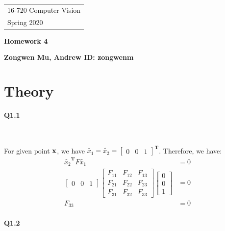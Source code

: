 \documentclass[11pt]{article} \usepackage{fullpage} \usepackage{graphicx} \usepackage{epstopdf} \usepackage{color} \usepackage{psfrag} \usepackage{pdfsync}\usepackage{indentfirst}\usepackage{subfigure}\usepackage{float}\usepackage[section]{placeins}
\begin{document}
{\parindent 0pt \begin{tabular}[t]{l} 16-720 Computer Vision \\ Spring 2020 \end{tabular}}%
\parindent 0pt \parskip 8pt
\begin{center} \large\bf Homework 4 \end{center}
\begin{center} \large\bf Zongwen Mu, Andrew ID: zongwenm \end{center}
\bigskip


\section{Theory}

\setlength{\parindent}{2em}  

\paragraph{Q1.1}~{}

For given point $\bold{x}$, we have $\tilde{x_1} = \tilde{x_2} = \begin{bmatrix} 0 & 0 & 1 \end{bmatrix}^\mathbf{T}$. Therefore, we have:
\begin{align}
	\tilde{x_2}^\mathbf{T}F\tilde{x_1} & = 0 \\
	\begin{bmatrix}
	0 & 0 & 1
	\end{bmatrix}
	\begin{bmatrix}
	F_{11} & F_{12} & F_{13} \\
	F_{21} & F_{22} & F_{23} \\
	F_{31} & F_{32} & F_{33}
	\end{bmatrix}
	\begin{bmatrix}
	0 \\ 0 \\ 1
	\end{bmatrix}
	& = 0 \\
	F_{33} & = 0 
\end{align}

\paragraph{Q1.2}~{}
\end{document}
